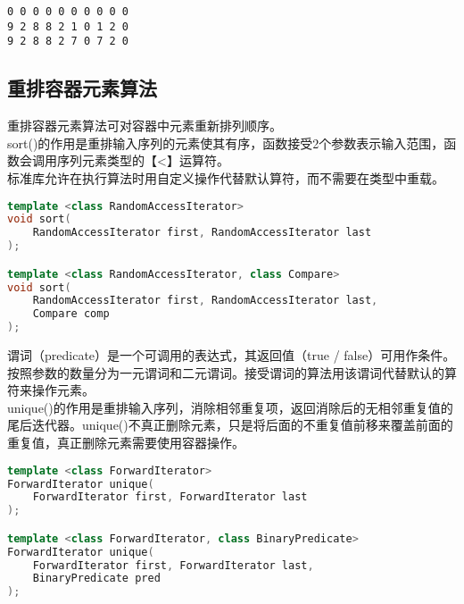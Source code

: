 \begin{tcolorbox}
	\begin{verbatim}
0 0 0 0 0 0 0 0 0 0 
9 2 8 8 2 1 0 1 2 0
9 2 8 8 2 7 0 7 2 0
	\end{verbatim}
\end{tcolorbox}

\vspace{0.5cm}

\subsection{重排容器元素算法}

重排容器元素算法可对容器中元素重新排列顺序。\\

sort()的作用是重排输入序列的元素使其有序，函数接受2个参数表示输入范围，函数会调用序列元素类型的【<】运算符。\\

标准库允许在执行算法时用自定义操作代替默认算符，而不需要在类型中重载。

\vspace{-0.5cm}

\begin{lstlisting}[language=C++]
template <class RandomAccessIterator>
void sort(
	RandomAccessIterator first, RandomAccessIterator last
);

template <class RandomAccessIterator, class Compare>
void sort(
	RandomAccessIterator first, RandomAccessIterator last, 
	Compare comp
);
\end{lstlisting}

谓词（predicate）是一个可调用的表达式，其返回值（true / false）可用作条件。按照参数的数量分为一元谓词和二元谓词。接受谓词的算法用该谓词代替默认的算符来操作元素。\\

unique()的作用是重排输入序列，消除相邻重复项，返回消除后的无相邻重复值的尾后迭代器。unique()不真正删除元素，只是将后面的不重复值前移来覆盖前面的重复值，真正删除元素需要使用容器操作。

\vspace{-0.5cm}

\begin{lstlisting}[language=C++]
template <class ForwardIterator>
ForwardIterator unique(
	ForwardIterator first, ForwardIterator last
);

template <class ForwardIterator, class BinaryPredicate>
ForwardIterator unique(
	ForwardIterator first, ForwardIterator last,
	BinaryPredicate pred
);
\end{lstlisting}

